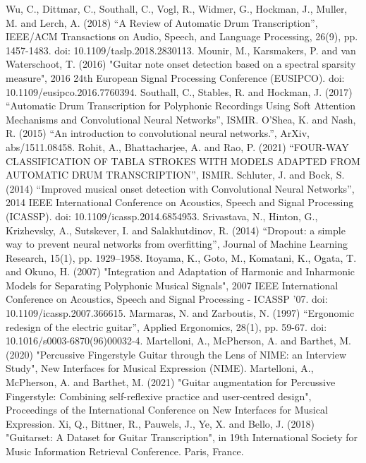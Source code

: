 \documentclass[conference]{IEEEtran}
\begin{document}
\begin{thebibliography}{00}

 Wu, C., Dittmar, C., Southall, C., Vogl, R., Widmer, G., Hockman, J., Muller, M. and Lerch, A. (2018) ``A Review of Automatic Drum Transcription'', IEEE/ACM Transactions on Audio, Speech, and Language Processing, 26(9), pp. 1457-1483. doi: 10.1109/taslp.2018.2830113.    
 Mounir, M., Karsmakers, P. and van Waterschoot, T. (2016) "Guitar note onset detection based on a spectral sparsity measure", 2016 24th European Signal Processing Conference (EUSIPCO). doi: 10.1109/eusipco.2016.7760394.
 Southall, C., Stables, R. and Hockman, J. (2017) ``Automatic Drum Transcription for Polyphonic Recordings Using Soft Attention Mechanisms and Convolutional Neural Networks'', ISMIR.
 O'Shea, K. and Nash, R. (2015) ``An introduction to convolutional neural networks.'', ArXiv, abs/1511.08458.
 Rohit, A., Bhattacharjee, A. and Rao, P. (2021) ``FOUR-WAY CLASSIFICATION OF TABLA STROKES WITH MODELS ADAPTED FROM AUTOMATIC DRUM TRANSCRIPTION'', ISMIR.
 Schluter, J. and Bock, S. (2014) ``Improved musical onset detection with Convolutional Neural Networks'', 2014 IEEE International Conference on Acoustics, Speech and Signal Processing (ICASSP). doi: 10.1109/icassp.2014.6854953.
 Srivastava, N., Hinton, G., Krizhevsky, A., Sutskever, I. and Salakhutdinov, R. (2014) ``Dropout: a simple way to prevent neural networks from overfitting'', Journal of Machine Learning Research, 15(1), pp. 1929–1958.
 Itoyama, K., Goto, M., Komatani, K., Ogata, T. and Okuno, H. (2007) "Integration and Adaptation of Harmonic and Inharmonic Models for Separating Polyphonic Musical Signals", 2007 IEEE International Conference on Acoustics, Speech and Signal Processing - ICASSP '07. doi: 10.1109/icassp.2007.366615.
 Marmaras, N. and Zarboutis, N. (1997) ``Ergonomic redesign of the electric guitar'', Applied Ergonomics, 28(1), pp. 59-67. doi: 10.1016/s0003-6870(96)00032-4.
 Martelloni, A., McPherson, A. and Barthet, M. (2020) "Percussive Fingerstyle Guitar through the Lens of NIME: an Interview Study", New Interfaces for Musical Expression (NIME).
 Martelloni, A., McPherson, A. and Barthet, M. (2021) "Guitar augmentation for Percussive Fingerstyle: Combining self-reflexive practice and user-centred design", Proceedings of the International Conference on New Interfaces for Musical Expression.
 Xi, Q., Bittner, R., Pauwels, J., Ye, X. and Bello, J. (2018) "Guitarset: A Dataset for Guitar Transcription", in 19th International Society for Music Information Retrieval Conference. Paris, France.

\end{thebibliography}
\end{document}
